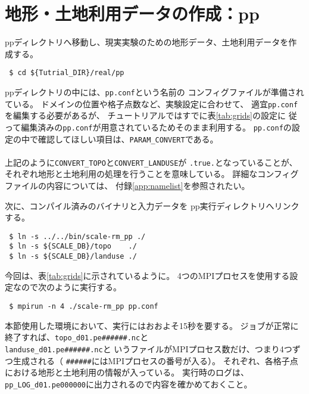 
\section{地形・土地利用データの作成：pp}

ppディレクトリへ移動し、現実実験のための地形データ、土地利用データを作成する。
\begin{verbatim}
 $ cd ${Tutrial_DIR}/real/pp
\end{verbatim}
ppディレクトリの中には、\verb|pp.conf|という名前の
コンフィグファイルが準備されている。
ドメインの位置や格子点数など、実験設定に合わせて、
適宜\verb|pp.conf|を編集する必要があるが、
チュートリアルではすでに表\ref{tab:grids}の設定に
従って編集済みの\verb|pp.conf|が用意されているためそのまま利用する。
\verb|pp.conf|の設定の中で確認してほしい項目は、\verb|PARAM_CONVERT|である。\\

\\

\noindent 上記のように\verb|CONVERT_TOPO|と\verb|CONVERT_LANDUSE|が
\verb|.true.|となっていることが、
それぞれ地形と土地利用の処理を行うことを意味している。
詳細なコンフィグファイルの内容については、
付録\ref{app:namelist}を参照されたい。

次に、コンパイル済みのバイナリと入力データを
pp実行ディレクトリへリンクする。
\begin{verbatim}
 $ ln -s ../../bin/scale-rm_pp ./
 $ ln -s ${SCALE_DB}/topo    ./
 $ ln -s ${SCALE_DB}/landuse ./
\end{verbatim}
今回は、表\ref{tab:grids}に示されているように。
4つのMPIプロセスを使用する設定なので次のように実行する。
\begin{verbatim}
 $ mpirun -n 4 ./scale-rm_pp pp.conf
\end{verbatim}
本節使用した環境において、実行にはおおよそ15秒を要する。
ジョブが正常に終了すれば、\verb|topo_d01.pe######.nc|と\\
\verb|landuse_d01.pe######.nc|と
いうファイルがMPIプロセス数だけ、つまり4つずつ生成される（
\verb|######|にはMPIプロセスの番号が入る）。
それぞれ、各格子点における地形と土地利用の情報が入っている。
実行時のログは、\verb|pp_LOG_d01.pe000000|に出力されるので内容を確かめておくこと。


